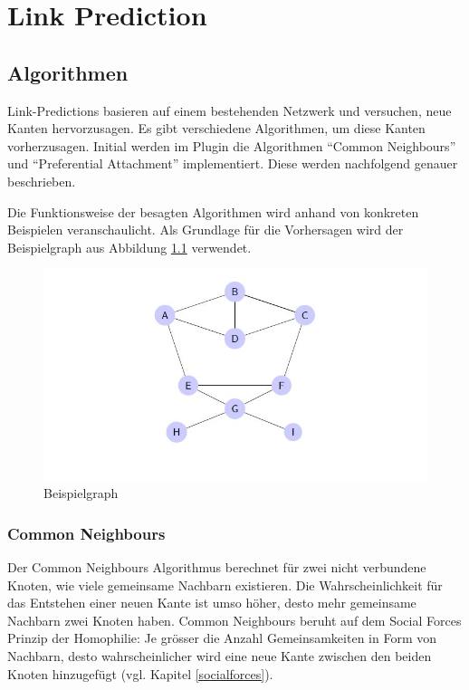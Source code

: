 \chapter{Link Prediction}

\section{Algorithmen}
Link-Predictions basieren auf einem bestehenden Netzwerk und versuchen, neue Kanten hervorzusagen.
Es gibt verschiedene Algorithmen, um diese Kanten vorherzusagen.
Initial werden im Plugin die Algorithmen ``Common Neighbours'' und ``Preferential Attachment'' implementiert. Diese werden nachfolgend genauer beschrieben.

Die Funktionsweise der besagten Algorithmen wird anhand von konkreten Beispielen veranschaulicht.
Als Grundlage für die Vorhersagen wird der Beispielgraph aus Abbildung \ref{fig:graph_bsp} verwendet.

\begin{figure}[h]
    \centering
    \includegraphics[scale=0.7]{resources/graph_example.JPG}
    \caption{Beispielgraph}
    \label{fig:graph_bsp}
\end{figure}

\subsection{Common Neighbours}
Der Common Neighbours Algorithmus berechnet für zwei nicht verbundene Knoten, wie viele gemeinsame Nachbarn existieren. Die Wahrscheinlichkeit
für das Entstehen einer neuen Kante ist umso höher, desto mehr gemeinsame Nachbarn zwei
Knoten haben. Common Neighbours beruht auf dem Social Forces Prinzip der Homophilie: Je grösser die Anzahl Gemeinsamkeiten in Form von Nachbarn, desto wahrscheinlicher wird eine neue Kante zwischen den beiden Knoten hinzugefügt (vgl. Kapitel \ref{socialforces}).


